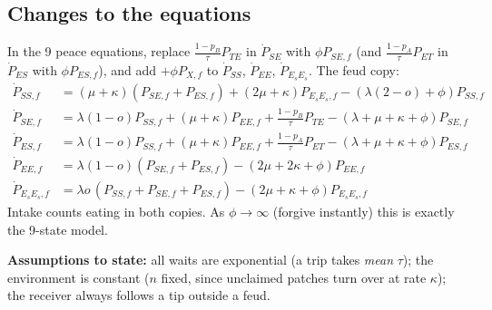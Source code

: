 \documentclass[11pt]{article}
\begin{document}
\subsection*{Changes to the equations}
In the 9 peace equations, replace $\frac{1-p_B}{\tau}P_{TE}$ in $\dot P_{SE}$ with $\phi P_{SE,f}$
(and $\frac{1-p_A}{\tau}P_{ET}$ in $\dot P_{ES}$ with $\phi P_{ES,f}$), and add $+\phi P_{X,f}$ to
$\dot P_{SS}$, $\dot P_{EE}$, $\dot P_{E_sE_s}$. The feud copy:
{\small
\begin{align*}
\dot P_{SS,f} &= (\mu+\kappa)(P_{SE,f}+P_{ES,f}) + (2\mu+\kappa) P_{E_sE_s,f} - (\lambda(2-o) + \phi)P_{SS,f}\\
\dot P_{SE,f} &= \lambda(1-o)P_{SS,f} + (\mu+\kappa) P_{EE,f} + \tfrac{1-p_B}{\tau}P_{TE} - (\lambda + \mu+\kappa + \phi)P_{SE,f}\\
\dot P_{ES,f} &= \lambda(1-o)P_{SS,f} + (\mu+\kappa) P_{EE,f} + \tfrac{1-p_A}{\tau}P_{ET} - (\lambda + \mu+\kappa + \phi)P_{ES,f}\\
\dot P_{EE,f} &= \lambda(1-o)(P_{SE,f}+P_{ES,f}) - (2\mu+2\kappa + \phi)P_{EE,f}\\
\dot P_{E_sE_s,f} &= \lambda o\,(P_{SS,f}+P_{SE,f}+P_{ES,f}) - (2\mu+\kappa + \phi)P_{E_sE_s,f}
\end{align*}}
Intake counts eating in both copies. As $\phi\to\infty$ (forgive instantly) this is exactly the 9-state model.

\textbf{Assumptions to state:} all waits are exponential (a trip takes \emph{mean} $\tau$); the environment is
constant ($n$ fixed, since unclaimed patches turn over at rate $\kappa$); the receiver always follows a tip outside a feud.
\end{document}
